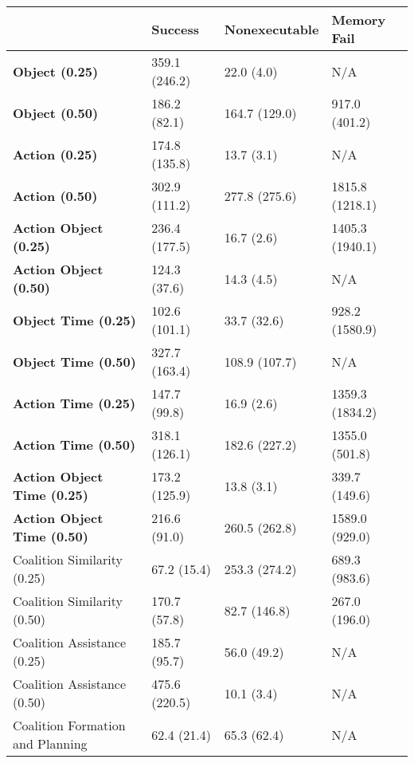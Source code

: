 \begin{tabular}{llll}
\hline
                                    & Success       & Nonexecutable   & Memory Fail     \\
\hline
 \textbf{Object (0.25)}             & 359.1 (246.2) & 22.0 (4.0)      & N/A             \\
 \textbf{Object (0.50)}             & 186.2 (82.1)  & 164.7 (129.0)   & 917.0 (401.2)   \\
 \textbf{Action (0.25)}             & 174.8 (135.8) & 13.7 (3.1)      & N/A             \\
 \textbf{Action (0.50)}             & 302.9 (111.2) & 277.8 (275.6)   & 1815.8 (1218.1) \\
 \textbf{Action Object (0.25)}      & 236.4 (177.5) & 16.7 (2.6)      & 1405.3 (1940.1) \\
 \textbf{Action Object (0.50)}      & 124.3 (37.6)  & 14.3 (4.5)      & N/A             \\
 \textbf{Object Time (0.25)}        & 102.6 (101.1) & 33.7 (32.6)     & 928.2 (1580.9)  \\
 \textbf{Object Time (0.50)}        & 327.7 (163.4) & 108.9 (107.7)   & N/A             \\
 \textbf{Action Time (0.25)}        & 147.7 (99.8)  & 16.9 (2.6)      & 1359.3 (1834.2) \\
 \textbf{Action Time (0.50)}        & 318.1 (126.1) & 182.6 (227.2)   & 1355.0 (501.8)  \\
 \textbf{Action Object Time (0.25)} & 173.2 (125.9) & 13.8 (3.1)      & 339.7 (149.6)   \\
 \textbf{Action Object Time (0.50)} & 216.6 (91.0)  & 260.5 (262.8)   & 1589.0 (929.0)  \\
 Coalition Similarity (0.25)        & 67.2 (15.4)   & 253.3 (274.2)   & 689.3 (983.6)   \\
 Coalition Similarity (0.50)        & 170.7 (57.8)  & 82.7 (146.8)    & 267.0 (196.0)   \\
 Coalition Assistance (0.25)        & 185.7 (95.7)  & 56.0 (49.2)     & N/A             \\
 Coalition Assistance (0.50)        & 475.6 (220.5) & 10.1 (3.4)      & N/A             \\
 Coalition Formation and Planning   & 62.4 (21.4)   & 65.3 (62.4)     & N/A             \\
\hline
\end{tabular}
